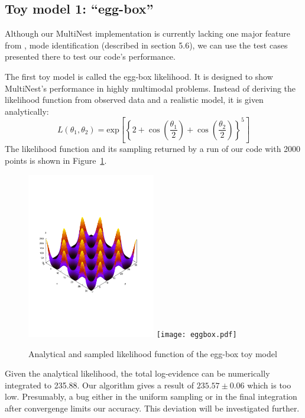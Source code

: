 \documentclass{article}
\begin{document}
\vspace{-0.54cm}

\subsection{Toy model 1: ``egg-box''}
Although our MultiNest implementation is currently lacking one major feature from  \cite{2009MNRAS.398.1601F}, mode identification (described in section 5.6), we can use the test cases presented there to test our code's performance.

The first toy model is called the egg-box likelihood. It is designed to show MultiNest's performance in highly multimodal problems. Instead of deriving the likelihood function from observed data and a realistic model, it is given analytically:
\[L(\theta_1,\theta_2) = \mathrm{exp}
\left[\left\{2+\cos\left(\frac{\theta_1}{2}\right)+\cos\left(\frac{\theta_2}{2}\right)\right\}^5\right]\]
The likelihood function and its sampling returned by a run of our code with 2000 points is shown in Figure~\ref{eggbox}.

\begin{figure}
\includegraphics[width=0.5\textwidth]{eggbox_analytic.pdf}
\texttt{[image: eggbox.pdf]}
\caption{Analytical and sampled likelihood function of the egg-box toy model}
\label{eggbox}
\end{figure}

Given the analytical likelihood, the total log-evidence can be numerically integrated to 235.88. Our algorithm gives a result of $235.57\pm 0.06$ which is too low. Presumably, a bug either in the uniform sampling or in the final integration after convergenge limits our accuracy. This deviation will be investigated further.
\end{document}
